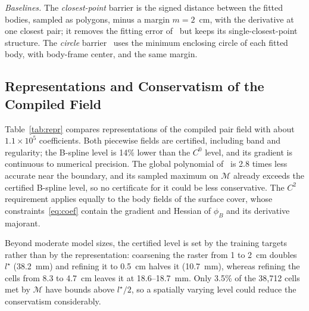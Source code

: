 \documentclass[journal]{IEEEtran}
\theoremstyle{definition}
\newcommand{\Mset}{\mathcal{M}}
\begin{document}
\emph{Baselines.} The \emph{closest-point} barrier is the signed distance between the fitted bodies,
sampled as polygons, minus a margin $m=2$~cm, with the derivative at one closest pair; it
removes the fitting error of~\cite{jo2026geometry} but keeps its single-closest-point structure.
The \emph{circle} barrier~\cite{wang2017safety} uses the minimum enclosing circle of each fitted
body, with body-frame center, and the same margin.

\subsection{Representations and Conservatism of the Compiled Field}\label{sec:exp-repr}
Table~\ref{tab:repr} compares representations of the compiled pair field with about
$1.1\times10^5$ coefficients. Both piecewise fields are certified, including band and regularity; the
B-spline level is 14\% lower than the $C^0$ level, and its gradient is continuous to numerical
precision. The global polynomial of~\cite{jo2026geometry} is 2.8 times less accurate near the
boundary, and its sampled maximum on $\Mset$ already exceeds the certified B-spline level, so no
certificate for it could be less conservative. The $C^2$ requirement applies equally to the body
fields of the surface cover, whose constraints~\eqref{eq:coef} contain the gradient and Hessian of
$\phi_B$ and its derivative majorant.

Beyond moderate model sizes, the certified level is set by the training targets rather than by the
representation: coarsening the raster from 1 to 2~cm doubles $l^\star$ (38.2~mm) and refining it to
0.5~cm halves it (10.7~mm), whereas refining the cells from 8.3 to 4.7~cm leaves it at 18.6--18.7~mm.
Only 3.5\% of the 38{,}712 cells met by $\Mset$ have bounds above $l^\star/2$, so a spatially varying
level could reduce the conservatism considerably.
\end{document}
